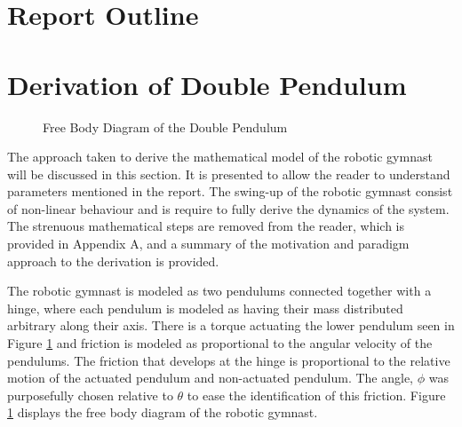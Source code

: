 \documentclass[a4paper,12pt]{article}
\begin{document}
 	
  	
  	
 	\section{Report Outline}
 	
 	

 	
 	
	\section{Derivation of Double Pendulum}
	\begin{figure}[h]
		\centering
		
		\caption{Free Body Diagram of the Double Pendulum}
		\label{fig:doublePen}
	\end{figure}

	The approach taken to derive the mathematical model of the robotic gymnast will be discussed in this section. It is presented to allow the reader to understand parameters mentioned in the report. The swing-up of the robotic gymnast consist of non-linear behaviour and is require to fully derive the dynamics of the system. The strenuous mathematical steps are removed from the reader, which is provided in Appendix A, and a summary of the motivation and paradigm approach to the derivation is provided.

	The robotic gymnast is modeled as two pendulums connected together with a hinge, where each pendulum is modeled as having their mass distributed arbitrary along their axis. There is a torque actuating the lower pendulum seen in Figure \ref{fig:doublePen} and friction is modeled as proportional to the angular velocity of the pendulums. The friction that develops at the hinge is proportional to the relative motion of the actuated pendulum and non-actuated pendulum. The angle, $\phi$ was purposefully chosen relative to $\theta$ to ease the identification of this friction. Figure \ref{fig:doublePen} displays the free body diagram of the robotic gymnast.
	
\end{document}
